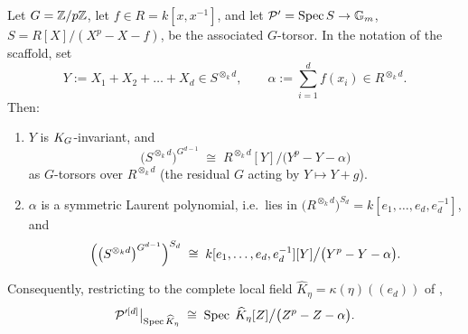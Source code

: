 \begin{prop}\label{prop:as_cover_identification}
    Let $G = \mathbb{Z}/p\mathbb{Z}$, let $f \in R = k[x, x^{-1}]$, and let
    $\mathcal{P}' = \operatorname{Spec} S \to \mathbb{G}_m$, $S = R[X]/(X^p - X - f)$, be the associated
    $G$-torsor. In the notation of the scaffold, set
    \[
        Y := X_1 + X_2 + \dots + X_d \in S^{\otimes_k d},
        \qquad
        \alpha := \sum_{i=1}^{d} f(x_i) \in R^{\otimes_k d}.
    \]
    Then:
    \begin{enumerate}
        \item \label{item:as_cover_invariance} $Y$ is $K_{G}$-invariant, and
        \[
            \bigl(S^{\otimes_k d}\bigr)^{G^{d-1}}
            \;\cong\;
            R^{\otimes_k d}[Y]\big/\bigl(Y^p - Y - \alpha\bigr)
        \]
        as $G$-torsors over $R^{\otimes_k d}$ (the residual $G$ acting by
        $Y \mapsto Y + g$).
        \item \label{item:as_cover_symmetry} $\alpha$ is a symmetric Laurent
        polynomial, i.e.\ lies in
        $\bigl(R^{\otimes_k d}\bigr)^{S_d} = k[e_1, \dots, e_d, e_d^{-1}]$, and
        \[
            \Bigl(\bigl(S^{\otimes_k d}\bigr)^{G^{d-1}}\Bigr)^{S_d}
            \;\cong\;
            k[e_1, \dots, e_d, e_d^{-1}][Y]\big/\bigl(Y^p - Y - \alpha\bigr).
        \]
    \end{enumerate}
    Consequently, restricting to the complete local field
    $\widehat K_\eta = \kappa(\eta)((e_d))$ of
    ,
    \[
        \mathcal{P}'^{[d]}\big|_{\operatorname{Spec} \widehat K_\eta}
        \;\cong\;
        \operatorname{Spec}\; \widehat K_\eta[Z]\big/\bigl(Z^p - Z - \alpha\bigr).
    \]
\end{prop}

